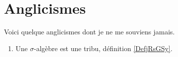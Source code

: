 \section{Anglicismes}

Voici quelque anglicismes dont je ne me souviens jamais.
\begin{enumerate}
    \item
        Une \( \sigma\)-algèbre est une tribu, définition \ref{DefjRsGSy}.
\end{enumerate}
